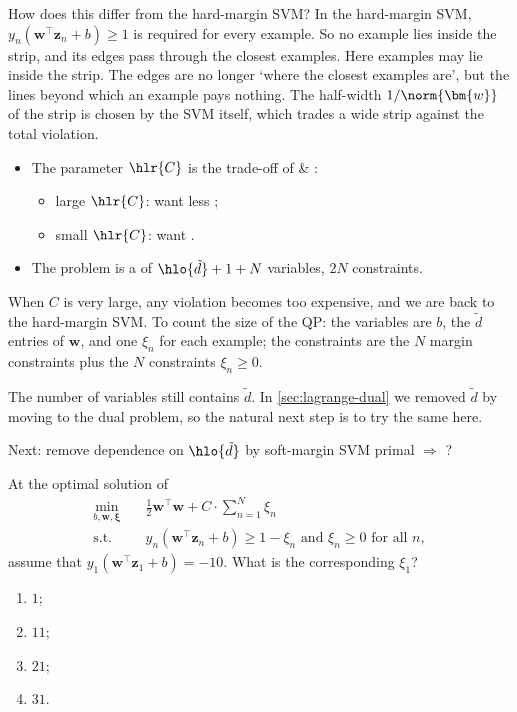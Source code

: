 How does this differ from the hard-margin SVM? In the hard-margin SVM,
\(y_n (\bm{w}^\top \bm{z}_n + b) \ge 1\) is required for every example. So
no example lies inside the strip, and its edges pass through the closest
examples. Here examples may lie inside
the strip. The edges are no longer `where the closest examples are', but
the lines beyond which an example pays nothing. The half-width \(1 /
\norm{\bm{w}}\) of the strip is chosen by the SVM itself, which trades a
wide strip against the total violation.

\begin{itemize}
    \item The parameter \(\hlr{C}\) is the trade-off of 
        \& :
        \begin{itemize}
            \item large \(\hlr{C}\): want less ;
            \item small \(\hlr{C}\): want .
        \end{itemize}
    \item The problem is a  of \(\hlo{\tilde{d}} + 1 + N\)
        variables, \(2N\) constraints.
\end{itemize}

When \(C\) is very large, any violation becomes too expensive, and we are
back to the hard-margin SVM. To count the size of the QP: the variables are
\(b\), the \(\tilde{d}\) entries of \(\bm{w}\), and one \(\xi_n\) for each
example; the constraints are the \(N\) margin constraints plus the \(N\)
constraints \(\xi_n \ge 0\).

The number of variables still contains \(\tilde{d}\). In
\autoref{sec:lagrange-dual} we removed \(\tilde{d}\) by moving to the dual
problem, so the natural next step is to try the same here.

\begin{question}
    Next: remove dependence on \(\hlo{\tilde{d}}\) by soft-margin SVM primal
    \(\Rightarrow\) ?
\end{question}

\begin{exercise}
    At the optimal solution of
    \[
        \begin{aligned}
            \min_{b, \bm{w}, \bm{\xi}} \quad & \frac{1}{2} \bm{w}^\top
                \bm{w} + C \cdot \sum_{n=1}^N \xi_n\\
            \text{s.t.} \quad & y_n (\bm{w}^\top \bm{z}_n + b) \ge 1 - \xi_n
                \text{ and } \xi_n \ge 0 \text{ for all } n,
        \end{aligned}
    \]
    assume that \(y_1 (\bm{w}^\top \bm{z}_1 + b) = -10\). What is the
    corresponding \(\xi_1\)?
    \begin{enumerate}[(1)]
        \item \(1\);
        \item \(11\);
        \item \(21\);
        \item \(31\).
    \end{enumerate}
\end{exercise}

